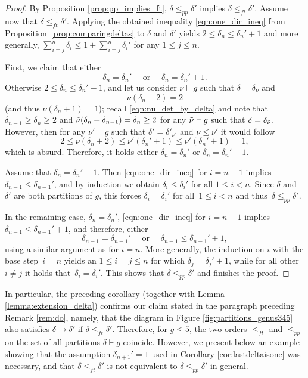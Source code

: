 \documentclass[11pt]{amsart}
\numberwithin{equation}{section}
\theoremstyle{plain}
\newcommand{\<}{\left \langle}
\renewcommand{\>}{\right \rangle}
\theoremstyle{definition}
\theoremstyle{remark}
\begin{document}
\begin{proof}
By Proposition \ref{prop:pp_implies_ft}, ${\delta}\leq_{pp} {\delta}'$ implies $\delta \leq_{ft} \delta'$.
Assume now that ${\delta} \leq_{ft} {\delta}'$.  Applying the obtained inequality \eqref{eqn:one_dir_ineq} from
Proposition~\ref{prop:comparingdeltas} to $\delta$ and $\delta'$ yields $2 \leq \delta_n \leq \delta_n' + 1$ and more generally, $\sum_{i = j}^n \delta_i \leq 1 + \sum_{i = j}^n \delta_i'$ for any $1 \leq j \leq n$. 

First, we claim that either $$\delta_n = \delta_n'\quad\text{ or }\quad \delta_n = \delta_n' + 1.$$ Otherwise $2 \leq \delta_n \leq \delta_n' - 1$, and let us consider $\nu \vdash g$ such that $\delta = \delta_{\nu}$ and $$\nu(\delta_n + 2) = 2$$ (and thus $\nu(\delta_n + 1) = 1$); recall \eqref{eqn:nu_det_by_delta} and note that $\delta_{n - 1} \geq \delta_n \geq 2$ and $\Tilde{\nu}(\delta_n + \delta_{n - 1}) = \delta_n \geq 2$ for any $\Tilde{\nu} \vdash g$ such that $\delta = \delta_{\Tilde{\nu}}$. However, then for any $\nu'\vdash g$ such that $\delta' = \delta'_{\nu'}$ and $\nu \leq \nu'$ it would follow $$2\leq \nu(\delta_n + 2) \leq \nu'(\delta_n' + 1) \leq \nu'(\delta_n' + 1) = 1, $$
which is absurd. Therefore, it holds either $\delta_n = \delta_n'$ or $\delta_n = \delta_n' + 1$. 

Assume that $\delta_n = \delta_n' + 1$. Then \eqref{eqn:one_dir_ineq} for $i = n - 1$ implies $\delta_{n-1} \leq \delta_{n - 1}'$, and by induction we obtain $\delta_{i} \leq \delta_{i}'$ for all $1 \leq i < n$. Since $\delta$ and $\delta'$ are both partitions of $g$, this forces $\delta_{i} = \delta_{i}'$ for all~$1 \leq i < n$ and thus~$\delta \leq_{pp} \delta'$. 

In the remaining case, $\delta_n = \delta_n'$, \eqref{eqn:one_dir_ineq} for $i = n - 1$ implies $\delta_{n-1} \leq \delta_{n - 1}' + 1$, and therefore, either $$\delta_{n-1} = \delta_{n - 1}'\quad \text{ or } \quad\delta_{n-1} \leq \delta_{n - 1}' + 1,$$ using a similar argument as for $i = n$. More generally, the induction on $i$ with the base step~$i = n$ yields an $1 \leq i = j \leq n$ for which $\delta_{j} = \delta_{j}' + 1$, while for all other $i \neq j$ it holds that~$\delta_i = \delta_i'$. This shows that  $\delta \leq_{pp} \delta'$ and finishes the proof.
 \end{proof}

In particular, the preceding corollary (together with Lemma \ref{lemma:extension_delta}) confirms our claim stated in the paragraph preceding Remark \ref{rem:do}, namely, that the diagram in Figure \ref{fig:partitions_genus345} also satisfies $\delta \to \delta'$ if $\delta \leq_{ft} \delta'$. Therefore, for $g \leq 5$, the two orders $\leq_{ft}$ and $\leq_{pp}$ on the set of all partitions $\delta \vdash g$ coincide.
However, we present below an example showing that the assumption $\delta_{n + 1}' = 1$ used in Corollary \ref{cor:lastdeltaisone} was necessary, and that $\delta \leq_{ft} \delta'$ is not equivalent to $\delta \leq_{pp} \delta'$ in general. 
\end{document}
